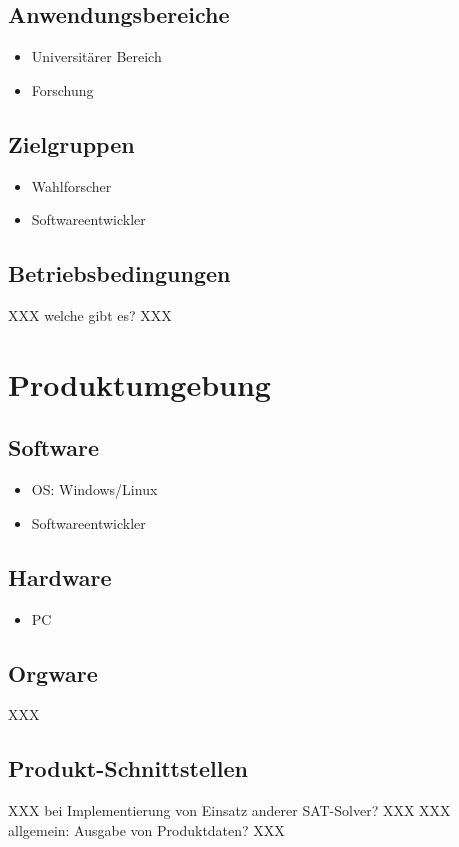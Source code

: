 \documentclass[a4paper]{scrreprt}
\begin{document}
\section{Anwendungsbereiche}
\begin{itemize}
\item Universitärer Bereich
\item Forschung
\end{itemize}

\section{Zielgruppen}
\begin{itemize}
\item Wahlforscher
\item Softwareentwickler
\end{itemize}

\section{Betriebsbedingungen}
XXX welche gibt es? XXX


\chapter{Produktumgebung}

\section{Software}
\begin{itemize}
\item OS: Windows/Linux
\item Softwareentwickler
\end{itemize}

\section{Hardware}
\begin{itemize}
\item PC
\end{itemize}

\section{Orgware}
XXX

\section{Produkt-Schnittstellen}
XXX bei Implementierung von Einsatz anderer SAT-Solver? XXX
XXX allgemein: Ausgabe von Produktdaten? XXX
\end{document}
